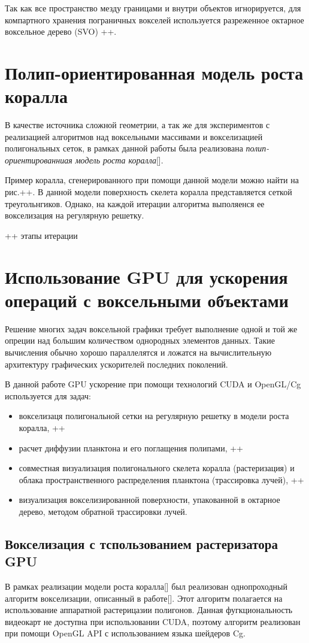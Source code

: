 \documentclass[a4paper,14pt]{extreport}
\begin{document}
Так как все пространство мезду границами и внутри объектов игнорируется, для компартного хранения пограничных вокселей используется разреженное октарное воксельное дерево (SVO) ++.

\section{Полип-ориентированная модель роста коралла}
В качестве источника сложной геометрии, а так же для экспериментов с реализацией алгоритмов над воксельными массивами и вокселизацией полигональных сеток, в рамках данной работы была реализована \emph{полип-ориентированниая модель роста коралла}[]. 

Пример коралла, сгенерированного при помощи данной модели можно найти на рис.++. В данной модели поверхность скелета коралла представляется сеткой треугольнгиков. Однако, на каждой итерации алгоритма выполяенся ее вокселизация на регулярную решетку.

++ этапы итерации

%

\section{Использование GPU для ускорения операций с воксельными объектами}

Решение многих задач воксельной графики требует выполнение одной и той же опреции над большим количеством однородных элементов данных. Такие вычисления обычно хорошо параллелятся и ложатся на вычислительную архитектуру графических ускорителей последних поколений.

В данной работе GPU ускорение при помощи технологий CUDA и OpenGL/Cg используется для задач:
\begin{itemize}
\item вокселизаця полигональной сетки на регулярную решетку в модели роста коралла, ++
\item расчет диффузии планктона и его поглащения полипами, ++
\item совместная визуализация полигонального скелета коралла (растеризация) и облака пространственного распределения планктона (трассировка лучей), ++
\item визуализация вокселизированной поверхности, упакованной в октарное дерево, методом обратной трассировки лучей.
\end{itemize}

\subsection{Вокселизация с тспользованием растеризатора GPU}
В рамках реализации модели роста коралла[] был реализован однопроходный алгоритм вокселизации, описанный в работе[]. Этот алгоритм полагается на использование аппаратной растерицазии полигонов. Данная фугкциональность видеокарт не доступна при использовании CUDA, поэтому алгоритм реализован при помощи OpenGL API с использованием языка шейдеров Cg.
\end{document}
